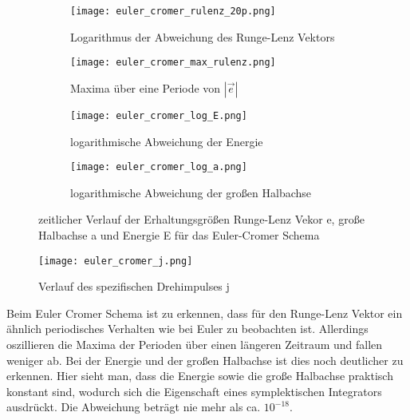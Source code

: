 \documentclass[12pt]{article}
\begin{document}
\begin{figure}[H]
    \hspace*{-1.5cm}
    \begin{subfigure}{0.4\textwidth}
    \texttt{[image: euler\_cromer\_rulenz\_20p.png]}
    \caption{Logarithmus der Abweichung des Runge-Lenz Vektors}
    \end{subfigure}
    \hfill
    \begin{subfigure}{0.4\textwidth}
    \hspace*{-0.8cm}
    \texttt{[image: euler\_cromer\_max\_rulenz.png]}
    \caption{Maxima über eine Periode von $|\vec{e}|$}
    \end{subfigure}
    \hfill
    \hspace*{-1.5cm}
    \begin{subfigure}{0.4\textwidth}
    \texttt{[image: euler\_cromer\_log\_E.png]}
    \caption{logarithmische Abweichung der Energie}
    \end{subfigure}
    \hfill
    \begin{subfigure}{0.4\textwidth}
    \hspace*{-0.8cm}
    \texttt{[image: euler\_cromer\_log\_a.png]}
    \caption{logarithmische Abweichung der großen Halbachse}
    \end{subfigure}
    \hfill
    \caption{zeitlicher Verlauf der Erhaltungsgrößen Runge-Lenz Vekor e, große Halbachse a und Energie E für das Euler-Cromer Schema}\end{figure}
    \begin{figure}[H]\centering\texttt{[image: euler\_cromer\_j.png]}\caption{Verlauf des spezifischen Drehimpulses j}\end{figure}
Beim Euler Cromer Schema ist zu erkennen, dass für den Runge-Lenz Vektor ein ähnlich periodisches Verhalten wie bei Euler zu beobachten ist. Allerdings oszillieren die Maxima der Perioden über einen längeren Zeitraum und fallen weniger ab. Bei der Energie und der großen Halbachse ist dies noch deutlicher zu erkennen. Hier sieht man, dass die Energie sowie die große Halbachse praktisch konstant sind, wodurch sich die Eigenschaft eines symplektischen Integrators ausdrückt. Die Abweichung beträgt nie mehr als ca. $10^{-18}$.\newpage
\end{document}
